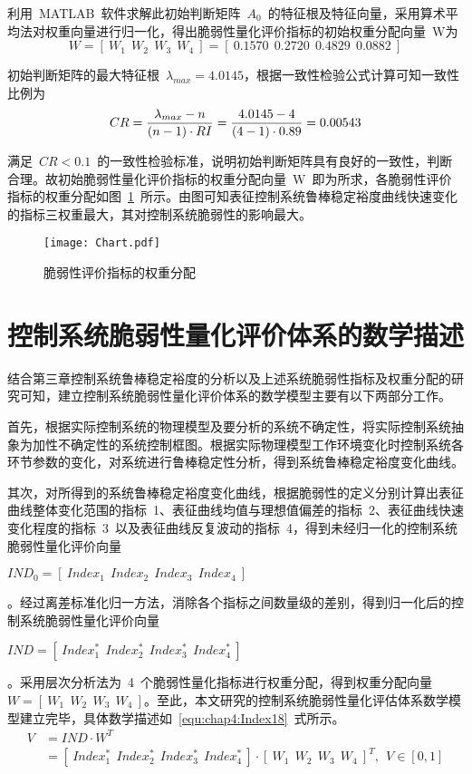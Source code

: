利用~MATLAB~软件求解此初始判断矩阵~$A_0$~的特征根及特征向量，采用算术平均法对权重向量进行归一化，得出脆弱性量化评价指标的初始权重分配向量~W为
\begin{equation}\label{equ:chap4:Index16}
    W=\left[~W_1~~W_2~~W_3~~W_4~\right]=\left[~0.1570~~0.2720~~0.4829~~0.0882~\right]
\end{equation}

初始判断矩阵的最大特征根~$\lambda_{max}=4.0145$，根据一致性检验公式计算可知一致性比例为
\begin{equation}\label{equ:chap4:Index17}
    CR=\displaystyle\frac{\lambda_{max}-n}{\left(n-1\right)\cdot RI}=\displaystyle\frac{4.0145-4}{\left(4-1\right)\cdot 0.89}=0.00543
\end{equation}

满足~$CR<0.1$~的一致性检验标准，说明初始判断矩阵具有良好的一致性，判断合理。故初始脆弱性量化评价指标的权重分配向量~W~即为所求，各脆弱性评价指标的权重分配如图~\ref{fig:chap4:chart}~所示。由图可知表征控制系统鲁棒稳定裕度曲线快速变化的指标三权重最大，其对控制系统脆弱性的影响最大。
\begin{figure}[h]
\centering
\texttt{[image: Chart.pdf]}
\caption{脆弱性评价指标的权重分配}\label{fig:chap4:chart}
\end{figure}
\section{控制系统脆弱性量化评价体系的数学描述}
\label{sec:chap4:Fragility_mathdiscribe}
结合第三章控制系统鲁棒稳定裕度的分析以及上述系统脆弱性指标及权重分配的研究可知，建立控制系统脆弱性量化评价体系的数学模型主要有以下两部分工作。

首先，根据实际控制系统的物理模型及要分析的系统不确定性，将实际控制系统抽象为加性不确定性的系统控制框图。根据实际物理模型工作环境变化时控制系统各环节参数的变化，对系统进行鲁棒稳定性分析，得到系统鲁棒稳定裕度变化曲线。

其次，对所得到的系统鲁棒稳定裕度变化曲线，根据脆弱性的定义分别计算出表征曲线整体变化范围的指标~1、表征曲线均值与理想值偏差的指标~2、表征曲线快速变化程度的指标~3~以及表征曲线反复波动的指标~4，得到未经归一化的控制系统脆弱性量化评价向量~\begin{small}$IND_0=\left[~Index_1~~Index_2~~Index_3~~Index_4~\right]$\end{small}。经过离差标准化归一方法，消除各个指标之间数量级的差别，得到归一化后的控制系统脆弱性量化评价向量~\begin{small}$IND=\left[~Index_1^{\ast}~~Index_2^{\ast}~~Index_3^{\ast}~~Index_4^{\ast}~\right]$\end{small}。采用层次分析法为~4~个脆弱性量化指标进行权重分配，得到权重分配向量~$W=\left[~W_1~~W_2~~W_3~~W_4~\right]$。至此，本文研究的控制系统脆弱性量化评估体系数学模型建立完毕，具体数学描述如~\ref{equ:chap4:Index18}~式所示。
\begin{equation}\label{equ:chap4:Index18}
\begin{split}
    V&=IND\cdot W^T\\
      &=\left[~Index_1^{\ast}~~Index_2^{\ast}~~Index_3^{\ast}~~Index_4^{\ast}~\right]\cdot \left[~W_1~~W_2~~W_3~~W_4~\right]^T,~~V\in \left[0,1\right]
\end{split}
\end{equation}

